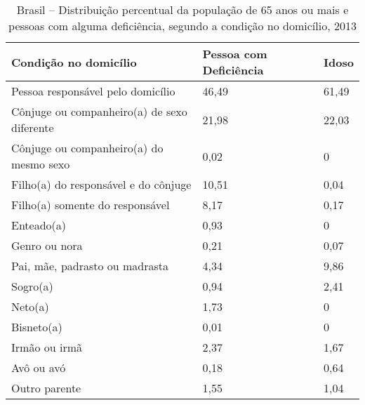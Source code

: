 \documentclass[
	12pt,				%
	openright,			%
	twoside,			%
	a4paper,			%
	english,			%
	french,				%
	spanish,			%
	brazil				%
	]{abntex2}
\begin{document}
\begin{table}[h]
	\footnotesize
	\centering
	\caption{Brasil -- Distribuição percentual da população de 65 anos ou mais e pessoas com alguma deficiência, segundo a condição no domicílio, 2013}
	\label{tab_prop_byc004}
	\begin{tabular}{@{}lm{4cm}m{3cm}@{}}
		\toprule
		\textbf{Condição no domicílio}                         & \textbf{Pessoa com Deficiência} & \textbf{Idoso}  \\ \midrule
		Pessoa responsável pelo domicílio                      & 46,49                           & 61,49           \\
		Cônjuge ou companheiro(a) de sexo diferente            & 21,98                           & 22,03           \\
		Cônjuge ou companheiro(a) do mesmo sexo                & 0,02                            & 0               \\
		Filho(a) do responsável e do cônjuge                   & 10,51                           & 0,04            \\
		Filho(a) somente do responsável                        & 8,17                            & 0,17            \\
		Enteado(a)                                             & 0,93                            & 0               \\
		Genro ou nora                                          & 0,21                            & 0,07            \\
		Pai, mãe, padrasto ou madrasta                         & 4,34                            & 9,86            \\
		Sogro(a)                                               & 0,94                            & 2,41            \\
		Neto(a)                                                & 1,73                            & 0               \\
		Bisneto(a)                                             & 0,01                            & 0               \\
		Irmão ou irmã                                          & 2,37                            & 1,67            \\
		Avô ou avó                                             & 0,18                            & 0,64            \\
		Outro parente                                          & 1,55                            & 1,04            \\

\end{tabular}
\end{table}
\end{document}
